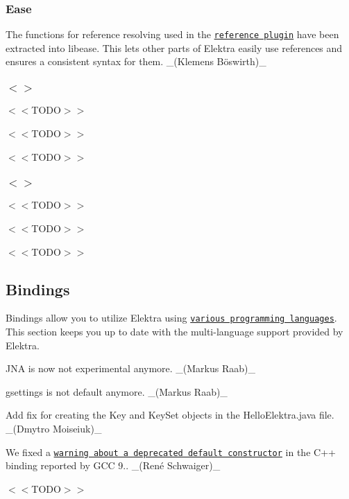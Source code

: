 \subsubsection*{Ease}


\begin{DoxyItemize}
\item The functions for reference resolving used in the \href{https://www.libelektra.org/plugins/reference}{\tt reference plugin} have been extracted into libease. This lets other parts of Elektra easily use references and ensures a consistent syntax for them. \+\_\+(Klemens Böswirth)\+\_\+
\end{DoxyItemize}

\subsubsection*{$<$$>$}


\begin{DoxyItemize}
\item $<$$<$\+T\+O\+D\+O$>$$>$
\item $<$$<$\+T\+O\+D\+O$>$$>$
\item $<$$<$\+T\+O\+D\+O$>$$>$
\end{DoxyItemize}

\subsubsection*{$<$$>$}


\begin{DoxyItemize}
\item $<$$<$\+T\+O\+D\+O$>$$>$
\item $<$$<$\+T\+O\+D\+O$>$$>$
\item $<$$<$\+T\+O\+D\+O$>$$>$
\end{DoxyItemize}

\subsection*{Bindings}

Bindings allow you to utilize Elektra using \href{https://www.libelektra.org/bindings/readme}{\tt various programming languages}. This section keeps you up to date with the multi-\/language support provided by Elektra.


\begin{DoxyItemize}
\item J\+NA is now not experimental anymore. \+\_\+(\+Markus Raab)\+\_\+
\item gsettings is not default anymore. \+\_\+(\+Markus Raab)\+\_\+
\item Add fix for creating the Key and Key\+Set objects in the Hello\+Elektra.\+java file. \+\_\+(\+Dmytro Moiseiuk)\+\_\+
\item We fixed a \href{https://issues.libelektra.org/2670}{\tt warning about a deprecated default constructor} in the C++ binding reported by G\+CC 9.. \+\_\+(René Schwaiger)\+\_\+
\item $<$$<$\+T\+O\+D\+O$>$$>$
\end{DoxyItemize}

